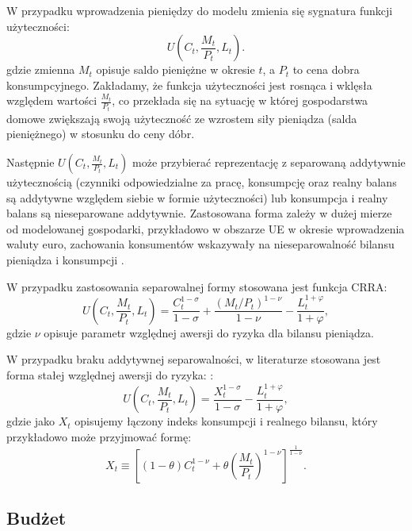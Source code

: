 W przypadku wprowadzenia pieniędzy do modelu zmienia się sygnatura funkcji użyteczności:
\begin{equation}
    U\left(C_t, \frac{M_t}{P_t}, L_t\right).
\end{equation}
gdzie zmienna $M_t$ opisuje saldo pieniężne w okresie $t$, a $P_t$ to cena dobra konsumpcyjnego. Zakładamy, że funkcja użyteczności jest rosnąca i wklęsła względem wartości $\frac{M_t}{P_t}$, co przekłada się na sytuację w której gospodarstwa domowe zwiększają swoją użyteczność ze wzrostem siły pieniądza (salda pieniężnego) w stosunku do ceny dóbr.

Następnie $U(C_t, \frac{M_t}{P_t}, L_t)$ może przybierać reprezentację z separowaną addytywnie użytecznością (czynniki odpowiedzialne za pracę, konsumpcję oraz realny balans są addytywne względem siebie w formie użyteczności) lub konsumpcja i realny balans są nieseparowane addytywnie. Zastosowana forma zależy w dużej mierze od modelowanej gospodarki, przykładowo w obszarze UE w okresie wprowadzenia waluty euro, zachowania konsumentów wskazywały na nieseparowalność bilansu pieniądza i konsumpcji \cite{RePEc:ecb:ecbwps:2006704}. 

W przypadku zastosowania separowalnej formy stosowana jest funkcja CRRA:
\begin{equation}
    U\left(C_t, \frac{M_t}{P_t}, L_t\right) = \frac{C^{1-\sigma}_t}{1-\sigma} + \frac{(M_t/P_t)^{1-\nu}}{1-\nu} - \frac{L_t^{1+\varphi}}{1+\varphi},
\end{equation}
gdzie $\nu$ opisuje parametr względnej awersji do ryzyka dla bilansu pieniądza.

W przypadku braku addytywnej separowalności, w literaturze stosowana jest forma stałej względnej awersji do ryzyka: \cite{gali}:
\begin{equation}
        U\left(C_t, \frac{M_t}{P_t}, L_t\right) = \frac{X^{1-\sigma}_t}{1-\sigma} - \frac{L_t^{1+\varphi}}{1+\varphi},
\end{equation}
gdzie jako $X_t$ opisujemy łączony indeks konsumpcji i  realnego bilansu, który przykładowo może przyjmować formę:
\begin{equation*}
    X_t \equiv \left[\left(1-\theta\right)C_t^{1-\nu} + \theta\left(\frac{M_t}{P_t}\right)^{1-\nu}\right]^{\frac{1}{1-\nu}}.
\end{equation*}

\subsection{Budżet}

